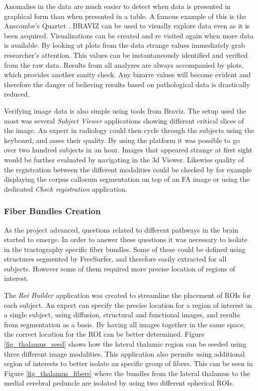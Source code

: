 Anomalies in the data are much easier to detect when data is presented in graphical form than when presented in a table. A famous example of this is the Anscombe's Quartet \autocite{anscombe_graphs_1973}. BRAVIZ can be used to visually explore data even as it is been acquired. Visualizations can be created and re visited again when more data is available. By looking at plots from the data strange values immediately grab researcher's attention. This values can be instantaneously identified and verified from the raw data. Results from all analyzes are always accompanied by plots, which provides another sanity check. Any bizarre values will become evident and therefore the danger of believing results based on pathological data is drastically reduced.

Verifying image data is also simple using tools from Braviz. The setup used the most was several \emph{Subject Viewer} applications showing different critical slices of the image. An expert in radiology could then cycle through the subjects using the keyboard, and asses their quality. By using the platform it was possible to go over two hundred subjects in an hour. Images that appeared strange at first sight would be further evaluated by navigating in the 3d Viewer. Likewise quality of the registration between the different modalities could be checked by for example displaying the corpus callosum segmentation on top of an FA image or using the dedicated \emph{Check registration} application. 

\subsubsection{Fiber Bundles Creation}

As the project advanced, questions related to different pathways in the brain started to emerge. In order to answer these questions it was necessary to isolate in the tractography specific fiber bundles. Some of these could be defined using structures segmented by FreeSurfer, and therefore easily extracted for all subjects. However some of them required more precise location of regions of interest. 

The \emph{Roi Builder} application was created to streamline the placement of ROIs for each subject. An expert can specify the precise location for a region of interest in a single subject, using diffusion, structural and functional images, and results from segmentation as a basis. By having all images together in the same space, the correct location for the ROI can be better determined. Figure \ref{fig_thalamus_seed} shows how the lateral thalamic region can be seeded using three different image modalities.  This application also permits using additional region of interests to better isolate an specific group of fibers. This can be seen in Figure \ref{fig_thalamus_fibers} where the bundles from the lateral thalamus to the medial cerebral peduncle are isolated by using two different spherical ROIs. 

